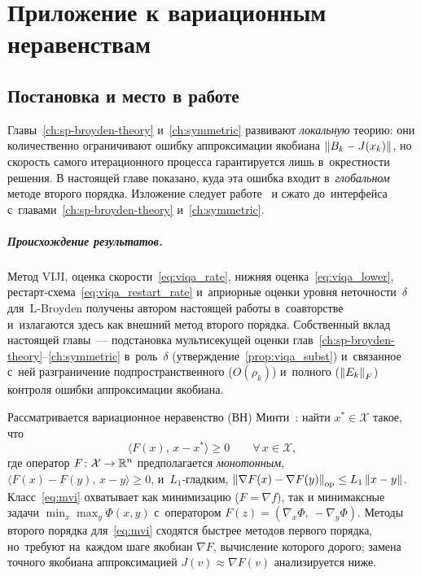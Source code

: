 \chapter{Приложение к вариационным неравенствам}\label{ch:viqa}

\section{Постановка и место в работе}\label{sec:viqa_setup}

Главы~\ref{ch:sp-broyden-theory} и~\ref{ch:symmetric} развивают
\emph{локальную} теорию: они количественно ограничивают ошибку
аппроксимации якобиана $\left\|B_k - J(x_k)\right\|$, но скорость самого
итерационного процесса гарантируется лишь в~окрестности решения. В
настоящей главе показано, куда эта ошибка входит в~\emph{глобальном}
методе второго порядка. Изложение следует
работе~\cite{viqa2024} и сжато до~интерфейса с~главами~\ref{ch:sp-broyden-theory}
и~\ref{ch:symmetric}.

\paragraph{Происхождение результатов.} Метод VIJI, оценка
скорости~\eqref{eq:viqa_rate}, нижняя оценка~\eqref{eq:viqa_lower},
рестарт-схема~\eqref{eq:viqa_restart_rate} и~априорные оценки уровня
неточности~$\delta$ для~L-Broyden получены автором настоящей работы
в~соавторстве~\cite{viqa2024} и~излагаются здесь как внешний метод
второго порядка. Собственный вклад настоящей главы~--- подстановка
мультисекущей оценки глав~\ref{ch:sp-broyden-theory}--\ref{ch:symmetric}
в~роль~$\delta$ (утверждение~\ref{prop:viqa_subst}) и~связанное с~ней
разграничение подпространственного ($O(\rho_k)$) и~полного ($\left\|E_k\right\|_F$)
контроля ошибки аппроксимации якобиана.


Рассматривается вариационное неравенство (ВН) Минти~\cite{facchinei2003}: найти
$x^*\in\mathcal{X}$ такое, что
\begin{equation}\label{eq:mvi}
  \langle F(x),\, x - x^*\rangle \ge 0 \qquad \forall\, x\in\mathcal{X},
\end{equation}
где оператор $F\colon\mathcal{X}\to\mathbb{R}^n$ предполагается
\emph{монотонным}, $\langle F(x)-F(y),\,x-y\rangle\ge 0$, и~$L_1$-гладким,
$\left\|\nabla F(x)-\nabla F(y)\right\|_{\mathrm{op}}\le L_1\left\|x-y\right\|$.
Класс~\eqref{eq:mvi} охватывает как минимизацию ($F=\nabla f$), так и
минимаксные задачи $\min_x\max_y\Phi(x,y)$ с~оператором
$F(z)=(\nabla_x\Phi,\,-\nabla_y\Phi)$. Методы второго порядка для~\eqref{eq:mvi}
сходятся быстрее методов первого порядка, но~требуют на~каждом шаге
якобиан $\nabla F$, вычисление которого дорого; замена точного якобиана
аппроксимацией $J(v)\approx\nabla F(v)$ анализируется ниже.

